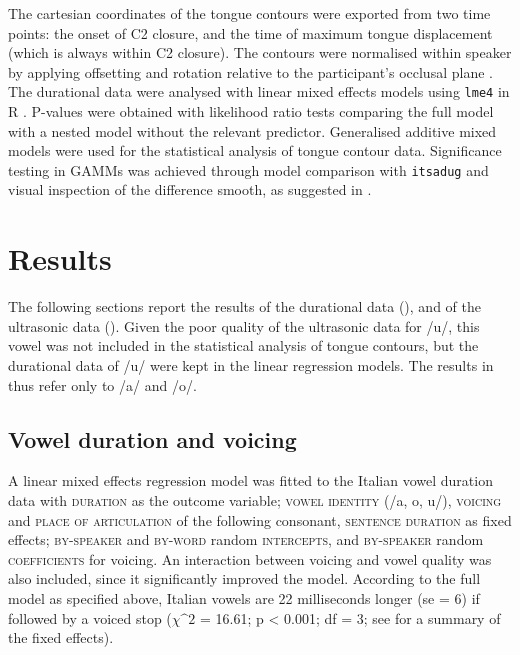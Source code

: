 \documentclass[authoryear, twocolumn]{elsarticle}
\begin{document}
The cartesian coordinates of the tongue contours were exported from two
time points: the onset of C2 closure, and the time of maximum tongue
displacement (which is always within C2 closure). The contours were
normalised within speaker by applying offsetting and rotation relative
to the participant's occlusal plane \citep{scobbie2011}. The durational
data were analysed with linear mixed effects models using \texttt{lme4}
in R \citep{r-core-team2017, bates2015}. P-values were obtained with
likelihood ratio tests comparing the full model with a nested model
without the relevant predictor. Generalised additive mixed models
\citep[GAMMs,][]{wood2006, zuur2012} were used for the statistical
analysis of tongue contour data. Significance testing in GAMMs was
achieved through model comparison with \texttt{itsadug}
\citep{van-rij2017} and visual inspection of the difference smooth, as
suggested in \citet{soskuthy2017}.

\section{Results}\label{results}

The following sections report the results of the durational data
(), and of the ultrasonic data ().
Given the poor quality of the ultrasonic data for /u/, this vowel was
not included in the statistical analysis of tongue contours, but the
durational data of /u/ were kept in the linear regression models. The
results in  thus refer only to /a/ and /o/.

\subsection{Vowel duration and
voicing}\label{vowel-duration-and-voicing}

\label{s:vow-duration}

A linear mixed effects regression model was fitted to the Italian vowel
duration data with \textsc{duration} as the outcome variable;
\textsc{vowel identity} (/a, o, u/), \textsc{voicing} and
\textsc{place of articulation} of the following consonant,
\textsc{sentence duration} as fixed effects; \textsc{by-speaker} and
\textsc{by-word} random \textsc{intercepts}, and \textsc{by-speaker}
random \textsc{coefficients} for voicing. An interaction between voicing
and vowel quality was also included, since it significantly improved the
model. According to the full model as specified above, Italian vowels
are 22 milliseconds longer (se = 6) if followed by a voiced stop
(\(\chi\^2\) = 16.61; p \textless{} 0.001; df = 3; see
 for a summary of the fixed effects).
\end{document}
